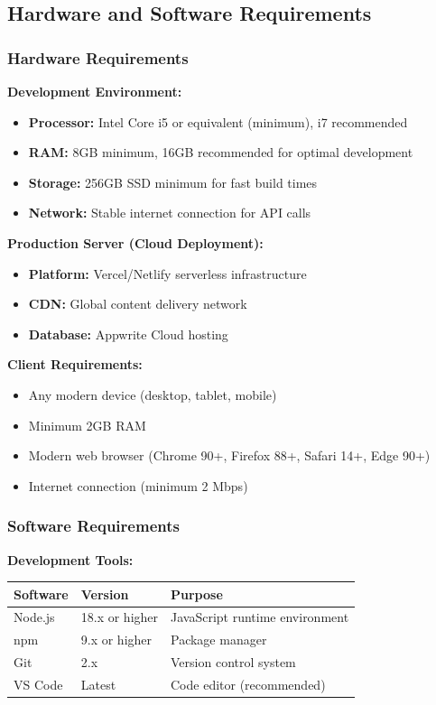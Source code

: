 \documentclass[11pt,a4paper]{article}
\begin{document}
\subsection{Hardware and Software Requirements}

\subsubsection{Hardware Requirements}

\textbf{Development Environment:}
\begin{itemize}
    \item \textbf{Processor:} Intel Core i5 or equivalent (minimum), i7 recommended
    \item \textbf{RAM:} 8GB minimum, 16GB recommended for optimal development
    \item \textbf{Storage:} 256GB SSD minimum for fast build times
    \item \textbf{Network:} Stable internet connection for API calls
\end{itemize}

\textbf{Production Server (Cloud Deployment):}
\begin{itemize}
    \item \textbf{Platform:} Vercel/Netlify serverless infrastructure
    \item \textbf{CDN:} Global content delivery network
    \item \textbf{Database:} Appwrite Cloud hosting
\end{itemize}

\textbf{Client Requirements:}
\begin{itemize}
    \item Any modern device (desktop, tablet, mobile)
    \item Minimum 2GB RAM
    \item Modern web browser (Chrome 90+, Firefox 88+, Safari 14+, Edge 90+)
    \item Internet connection (minimum 2 Mbps)
\end{itemize}

\subsubsection{Software Requirements}

\textbf{Development Tools:}
\begin{table}[H]
\begin{tabular}{|l|l|l|}
\hline
\textbf{Software} & \textbf{Version} & \textbf{Purpose} \\
\hline
Node.js & 18.x or higher & JavaScript runtime environment \\
npm & 9.x or higher & Package manager \\
Git & 2.x & Version control system \\
VS Code & Latest & Code editor (recommended) \\
\hline
\end{tabular}
\end{table}
\end{document}
